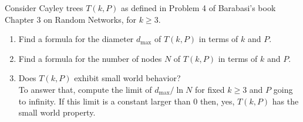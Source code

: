 \documentclass[assignment = 4]{homework}
\begin{document}
    \pagestyle{main}

    Consider Cayley trees $T(k,P)$ as defined in Problem 4 of Barabasi's book Chapter 3 on Random Networks, for $k \geq 3$.

    \begin{enumerate}
        \item Find a formula for the diameter $d_{\max}$ of $T(k,P)$ in terms of $k$ and $P$.
        \item Find a formula for the number of nodes $N$ of $T(k,P)$ in terms of $k$ and $P$.
        \item Does $T(k,P)$ exhibit small world behavior? \\
        To answer that, compute the limit of $d_{\max}/\ln N$ for fixed $k \geq 3$ and $P$ going to infinity.  If this limit is a constant larger than 0 then, yes, $T(k,P)$ has the small world property.
    \end{enumerate}

    
    
\end{document}
